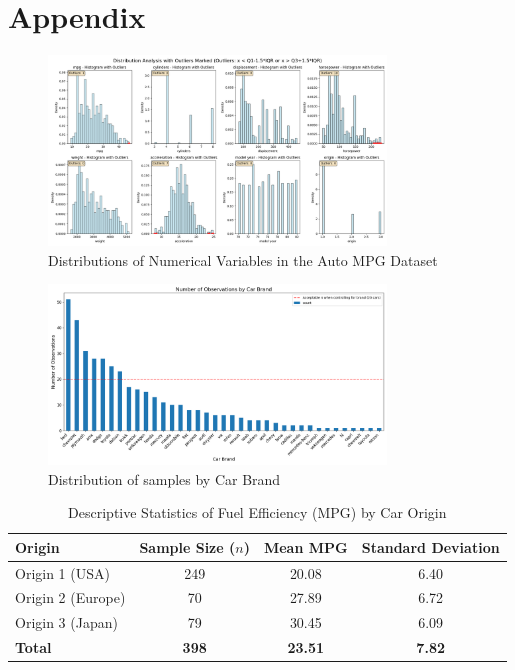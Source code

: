 \documentclass[12pt]{article}
\begin{document}
\clearpage
\section{Appendix}

\begin{figure}[!h]
    \centering
    \includegraphics[width=0.8\textwidth]{../results/numerical_distributions_with_outliers.png}
    \caption{Distributions of Numerical Variables in the Auto MPG Dataset}
    \label{fig:numerical_distributions_with_outliers}
\end{figure}

\begin{figure}[!h]
    \centering
    \includegraphics[width=0.8\textwidth]{../results/brand_distribution.png}
    \caption{Distribution of samples by Car Brand}
    \label{fig:brand_distribution}
\end{figure}

\begin{table}[!h]
\centering
\caption{Descriptive Statistics of Fuel Efficiency (MPG) by Car Origin}
\label{tab:descriptive_stats}
\begin{tabular}{lccc}
\toprule
\textbf{Origin} & \textbf{Sample Size ($n$)} & \textbf{Mean MPG} & \textbf{Standard Deviation} \\
\midrule
Origin 1 (USA) & 249 & 20.08 & 6.40 \\
Origin 2 (Europe) & 70 & 27.89 & 6.72 \\
Origin 3 (Japan) & 79 & 30.45 & 6.09 \\
\midrule
\textbf{Total} & \textbf{398} & \textbf{23.51} & \textbf{7.82} \\
\bottomrule
\end{tabular}
\end{table}
\end{document}
